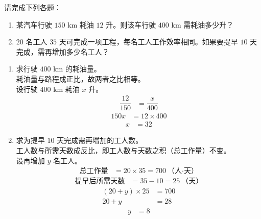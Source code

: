 \documentclass[12pt,a4paper,fontset=none]{exam-zh}
\begin{document}
\begin{question}[points = 10]
    请完成下列各题：

    \begin{enumerate}[label=(\alph*)]
        \item 某汽车行驶 $150$ km 耗油 $12$ 升。则该车行驶 $400$ km 需耗油多少升？

        \item $20$ 名工人 $35$ 天可完成一项工程，每名工人工作效率相同。如果要提早 $10$ 天完成，需再增加多少名工人？
    \end{enumerate}
\end{question}

\begin{solution}
    \begin{enumerate}[label=(\alph*)]
        \item 求行驶 $400$ km 的耗油量。 \\
        耗油量与路程成正比，故两者之比相等。 \\
        设行驶 $400$ km 耗油 $x$ 升。 \\
        \begin{align*}
            \dfrac{12}{150} &= \dfrac{x}{400}
        \end{align*}
        \begin{align*}
            150x &= 12 \times 400
        \end{align*}
        \begin{align*}
            x &= 32
        \end{align*}

        \item 求为提早 $10$ 天完成需再增加的工人数。 \\
        工人数与所需天数成反比，即工人数与天数之积（总工作量）不变。 \\
        设再增加 $y$ 名工人。 \\
        \begin{align*}
            \text{总工作量} &= 20 \times 35 = 700 \ \text{（人·天）}
        \end{align*}
        \begin{align*}
            \text{提早后所需天数} &= 35 - 10 = 25 \ \text{（天）}
        \end{align*}
        \begin{align*}
            (20 + y) \times 25 &= 700 \\
            20 + y &= 28
        \end{align*}
        \begin{align*}
            y &= 8
        \end{align*}
    \end{enumerate}
\end{solution}
\end{document}
